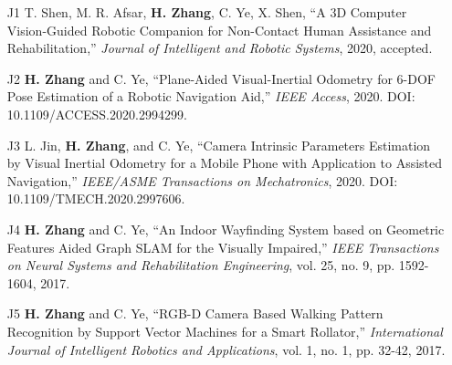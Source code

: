 

\begin{justify}
	\begin{itemize}[before=\fontsize{9pt}{1em}\bodyfontlight\upshape\color{text},leftmargin=3ex, nosep, noitemsep]
		\setlength{\parskip}{0pt}
		\renewcommand{\labelitemi}{\bullet}
		\item[J1]{T. Shen, M. R. Afsar, \textbf{H. Zhang}, C. Ye, X. Shen, “A 3D Computer Vision-Guided Robotic Companion for Non-Contact Human Assistance and Rehabilitation,” \emph{Journal of Intelligent and Robotic Systems}, 2020, accepted.}
		\item[J2]{\textbf{H. Zhang} and C. Ye, “Plane-Aided Visual-Inertial Odometry for 6-DOF Pose Estimation of a Robotic Navigation Aid,” \emph{IEEE Access}, 2020. DOI: 10.1109/ACCESS.2020.2994299.}
		\item[J3]{L. Jin, \textbf{H. Zhang}, and C. Ye, “Camera Intrinsic Parameters Estimation by Visual Inertial Odometry for a Mobile Phone with Application to Assisted Navigation,” \emph{IEEE/ASME Transactions on Mechatronics}, 2020. DOI: 10.1109/TMECH.2020.2997606.}
		\item[J4]{\textbf{H. Zhang} and C. Ye, “An Indoor Wayfinding System based on Geometric Features Aided Graph SLAM for the Visually Impaired,” \emph{IEEE Transactions on Neural Systems and Rehabilitation Engineering}, vol. 25, no. 9, pp. 1592-1604, 2017.}
		\item[J5]{\textbf{H. Zhang} and C. Ye, “RGB-D Camera Based Walking Pattern Recognition by Support Vector Machines for a Smart Rollator,” \emph{International Journal of Intelligent Robotics and Applications}, vol. 1, no. 1, pp. 32-42, 2017.}
	\end{itemize}
\end{justify}


